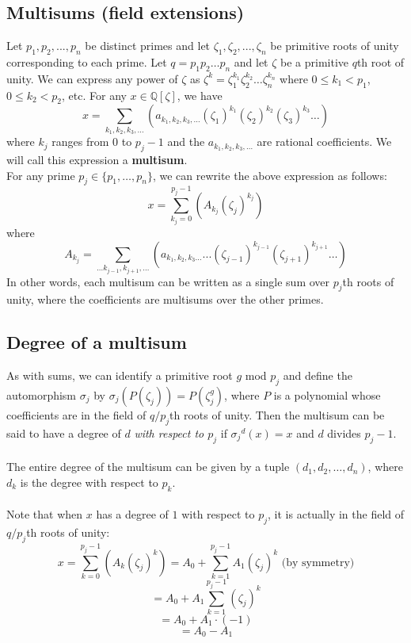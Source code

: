 \documentclass{article}
\begin{document}
    \subsection{Multisums (field extensions)}
        Let $ p_1, p_2, ..., p_n $ be distinct primes and let $ \zeta_1, \zeta_2, ..., \zeta_n $ be primitive roots of unity corresponding to each prime. Let $ q = p_1 p_2 \dots p_n $ and let $ \zeta $ be a primitive $ q $th root of unity. We can express any power of $ \zeta $ as $ \zeta^k = \zeta_1^{k_1} \zeta_2^{k_2} \dots \zeta_n^{k_n} $ where $ 0 \le k_1 < p_1 $, $ 0 \le k_2 < p_2 $, etc. For any $ x \in \mathbb{Q}[\zeta] $, we have
        $$ x = \sum_{k_1, k_2, k_3, \dots} (a_{k_1, k_2, k_3, \dots} (\zeta_1)^{k_1} (\zeta_2)^{k_2} (\zeta_3)^{k_3} \dots) $$ where $ k_j $ ranges from $ 0 $ to $ p_j - 1 $ and the $ a_{k_1, k_2, k_3, \dots} $ are rational coefficients. We will call this expression a \textbf{multisum}.\\
        For any prime $ p_j \in \{p_1, \dots, p_n\} $, we can rewrite the above expression as follows:
        $$ x = \sum_{k_j = 0}^{p_j - 1} (A_{k_j} (\zeta_j)^{k_j}) $$
        where
        $$ A_{k_j} = \sum_{\dots k_{j - 1}, k_{j + 1}, \dots} (a_{k_1, k_2, k_3 \dots} ... (\zeta_{j - 1})^{k_{j - 1}} (\zeta_{j + 1})^{k_{j + 1}} \dots) $$
        In other words, each multisum can be written as a single sum over $ p_j $th roots of unity, where the coefficients are multisums over the other primes.\\
        \subsection{Degree of a multisum}
            As with sums, we can identify a primitive root $ g $ mod $ p_j $ and define the automorphism $ \sigma_j $ by $ \sigma_j(P(\zeta_j)) = P(\zeta_j^g) $, where $ P $ is a polynomial whose coefficients are in the field of $ q/p_j $th roots of unity. Then the multisum can be said to have a degree of $ d $ \textit{with respect to $ p_j $} if $ {\sigma_j}^d(x) = x $ and $ d $ divides $ p_j - 1 $.\\
            \\
            The entire degree of the multisum can be given by a tuple $ (d_1, d_2, \dots, d_n) $, where $ d_k $ is the degree with respect to $ p_k $.\\
            \\
            Note that when $ x $ has a degree of $ 1 $ with respect to $ p_j $, it is actually in the field of $ q/p_j $th roots of unity:
            $$ x = \sum_{k = 0}^{p_j - 1} (A_k (\zeta_j)^k) = A_0 + \sum_{k = 1}^{p_j - 1} A_1 (\zeta_j)^k \text{ (by symmetry)} $$
            $$ = A_0 + A_1 \sum_{k = 1}^{p_j - 1} (\zeta_j)^k $$
            $$ = A_0 + A_1 \cdot (-1) $$
            $$ = A_0 - A_1 $$
\end{document}
